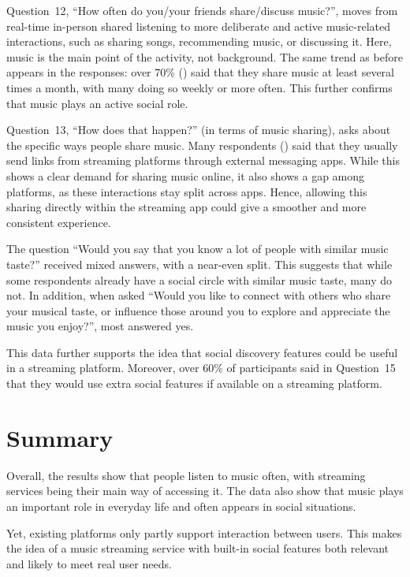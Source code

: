 Question~12, ``How often do you/your friends share/discuss music?'',
moves from real-time in-person shared listening to more deliberate and active
music-related interactions, such as sharing songs, recommending music, or discussing it.
Here, music is the main point of the activity, not background.
The same trend as before appears in the responses:
over 70\% () said that they share music at least several
times a month, with many doing so weekly or more often.
This further confirms that music plays an active social role.

Question~13, ``How does that happen?'' (in terms of music sharing),
asks about the specific ways people share music.
Many respondents () said that they usually send links
from streaming platforms through external messaging apps.
While this shows a clear demand for sharing music online, it also shows a gap among platforms,
as these interactions stay split across apps.
Hence, allowing this sharing directly within the streaming app could give a smoother
and more consistent experience.

The question ``Would you say that you know a lot of people with similar music taste?''
received mixed answers, with a near-even split.
This suggests that while some respondents already have a social circle with similar music taste, many do not.
In addition, when asked
``Would you like to connect with others who share your musical taste, or influence those around you to explore and appreciate the music you enjoy?'',
most answered yes.

This data further supports the idea that social discovery features could be useful in a streaming platform.
Moreover, over 60\% of participants said in Question~15 that they would use
extra social features if available on a streaming platform.


\section{Summary}
Overall, the results show that people listen to music often,
with streaming services being their main way of accessing it.
The data also show that music plays an important role in everyday life
and often appears in social situations.

Yet, existing platforms only partly support interaction between users.
This makes the idea of a music streaming service with built-in social features both relevant and
likely to meet real user needs.
